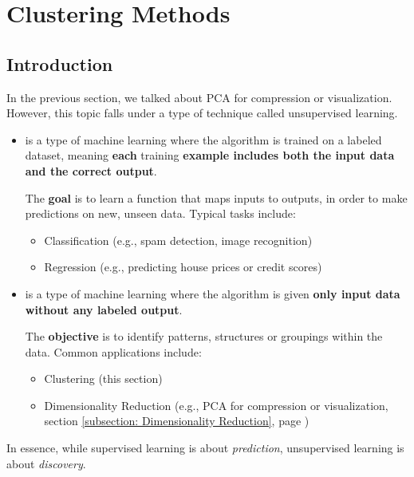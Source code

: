 \section{Clustering Methods}

\subsection{Introduction}

In the previous section, we talked about PCA for compression or visualization. However, this topic falls under a type of technique called unsupervised learning.
\begin{itemize}
    \item {} is a type of machine learning where the algorithm is trained on a labeled dataset, meaning \textbf{each} training \textbf{example includes both the input data and the correct output}.
    
    The \textbf{goal} is to learn a function that maps inputs to outputs, in order to make predictions on new, unseen data. Typical tasks include:
    \begin{itemize}
        \item Classification (e.g., spam detection, image recognition)
        \item Regression (e.g., predicting house prices or credit scores)
    \end{itemize}
    

    \item {} is a type of machine learning where the algorithm is given \textbf{only input data without any labeled output}.
    
    The \textbf{objective} is to identify patterns, structures or groupings within the data. Common applications include:
    \begin{itemize}
        \item Clustering (this section)
        \item Dimensionality Reduction (e.g., PCA for compression or visualization, section \ref{subsection: Dimensionality Reduction}, page \pageref{subsection: Dimensionality Reduction})
    \end{itemize}
\end{itemize}
In essence, while supervised learning is about \emph{prediction}, unsupervised learning is about \emph{discovery}.

